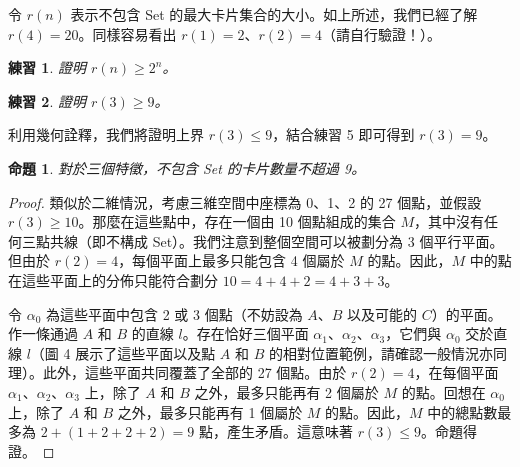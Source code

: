 \documentclass[12pt, a4paper]{article}
\newtheorem{proposition}{命題}
\newtheorem{exercise}{練習}
\begin{document}
\begin{center}
\end{center}

令 $r(n)$ 表示不包含 Set 的最大卡片集合的大小。如上所述，我們已經了解 $r(4)=20$。同樣容易看出 $r(1)=2$、$r(2)=4$（請自行驗證！）。

\begin{exercise}
證明 $r(n)\ge2^{n}$。
\end{exercise}
\begin{exercise}
證明 $r(3)\ge9$。
\end{exercise}

利用幾何詮釋，我們將證明上界 $r(3)\le9$，結合練習 5 即可得到 $r(3)=9$。

\begin{proposition}
對於三個特徵，不包含 Set 的卡片數量不超過 9。
\end{proposition}
\begin{proof}
類似於二維情況，考慮三維空間中座標為 0、1、2 的 27 個點，並假設 $r(3)\ge10$。那麼在這些點中，存在一個由 10 個點組成的集合 $M$，其中沒有任何三點共線（即不構成 Set）。我們注意到整個空間可以被劃分為 3 個平行平面。但由於 $r(2)=4$，每個平面上最多只能包含 4 個屬於 $M$ 的點。因此，$M$ 中的點在這些平面上的分佈只能符合劃分 $10=4+4+2=4+3+3$。

令 $\alpha_{0}$ 為這些平面中包含 2 或 3 個點（不妨設為 $A$、$B$ 以及可能的 $C$）的平面。作一條通過 $A$ 和 $B$ 的直線 $l$。存在恰好三個平面 $\alpha_{1}$、$\alpha_{2}$、$\alpha_{3}$，它們與 $\alpha_{0}$ 交於直線 $l$（圖 4 展示了這些平面以及點 $A$ 和 $B$ 的相對位置範例，請確認一般情況亦同理）。此外，這些平面共同覆蓋了全部的 27 個點。由於 $r(2)=4$，在每個平面 $\alpha_{1}$、$\alpha_{2}$、$\alpha_{3}$ 上，除了 $A$ 和 $B$ 之外，最多只能再有 2 個屬於 $M$ 的點。回想在 $\alpha_{0}$ 上，除了 $A$ 和 $B$ 之外，最多只能再有 1 個屬於 $M$ 的點。因此，$M$ 中的總點數最多為 $2+(1+2+2+2)=9$ 點，產生矛盾。這意味著 $r(3)\le9$。命題得證。
\end{proof}
\end{document}
